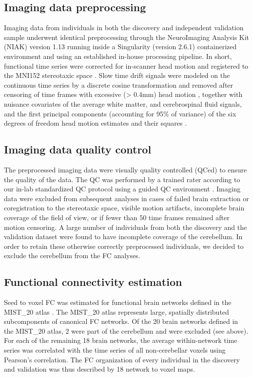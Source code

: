 \documentclass[9pt,lineno]{elife}
\begin{document}
\subsection{Imaging data preprocessing}
Imaging data from individuals in both the discovery and independent validation sample underwent identical preprocessing through the NeuroImaging Analysis Kit (NIAK) version 1.13 \citep{Bellec2011-cr} running inside a Singularity (version 2.6.1) containerized environment \citep{Kurtzer2017-qb} and using an established in-house processing pipeline. In short, functional time series were corrected for in-scanner head motion and registered to the MNI152 stereotaxic space \citep{Evans1994-ek}. Slow time drift signals were modeled on the continuous time series by a discrete cosine transformation and removed after censoring of time frames with excessive (> 0.4mm) head motion \citep{Power2012-nn}, together with nuisance covariates of the average white matter, and cerebrospinal fluid signals, and the first principal components (accounting for 95\% of variance) of the six degrees of freedom head motion estimates and their squares \citep{Giove2009-eh}.

\subsection{Imaging data quality control}
The preprocessed imaging data were visually quality controlled (QCed) to ensure the quality of the data. The QC was performed by a trained rater according to our in-lab standardized QC protocol \citep{Benhajali2019-yi} using a guided QC environment \citep{Urchs2018-ml}. Imaging data were excluded from subsequent analyses in cases of failed brain extraction or coregistration to the stereotaxic space, visible motion artifacts, incomplete brain coverage of the field of view, or if fewer than 50 time frames remained after motion censoring. A large number of individuals from both the discovery and the validation dataset were found to have incomplete coverage of the cerebellum. In order to retain these otherwise correctly preprocessed individuals, we decided to exclude the cerebellum from the FC analyses.

\subsection{Functional connectivity estimation}
Seed to voxel FC was estimated for functional brain networks defined in the MIST\_20 atlas \citep{Urchs2017-tl}. The MIST\_20 atlas represents large, spatially distributed subcomponents of canonical FC networks. Of the 20 brain networks defined in the MIST\_20 atlas, 2 were part of the cerebellum and were excluded (see above). For each of the remaining 18 brain networks, the average within-network time series was correlated with the time series of all non-cerebellar voxels using Pearson’s correlation. The FC organization of every individual in the discovery and validation was thus described by 18 network to voxel maps.
\end{document}
